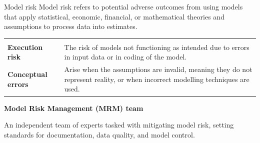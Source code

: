 


\begin{ordefbox}{Model risk}
Model risk refers to potential adverse outcomes from using models that apply
statistical, economic, financial, or mathematical theories and assumptions to
process data into estimates.
\end{ordefbox}


\noindent\begin{minipage}{\textwidth}
\renewcommand{\arraystretch}{1.35}
\begin{tabularx}{\textwidth}{@{}L{0.22\textwidth}Y@{}}
  & \\
{\tabfont \textbf{Execution risk}} &
{\tabfont The risk of models not functioning as intended due to errors in input
data or in coding of the model.}\\
{\tabfont \textbf{Conceptual errors}} &
{\tabfont Arise when the assumptions are invalid, meaning they do not represent
reality, or when incorrect modelling techniques are used.}\\
\end{tabularx}
\end{minipage}


\begin{orkeybox}
{\sffamily\bfseries\fontsize{8.6}{10}\selectfont\color{navy}Model Risk Management
(MRM) team}\par
\vspace{2pt}
An independent team of experts tasked with mitigating model risk, setting
standards for documentation, data quality, and model control.
\end{orkeybox}


